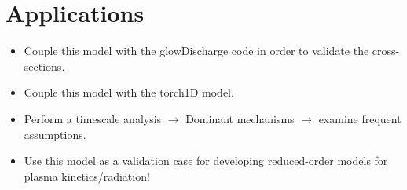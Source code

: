 \section{Applications} \label{sec:Applications}

\begin{itemize}[noitemsep,topsep=1pt,parsep=1pt,partopsep=3pt]
    \item Couple this model with the glowDischarge code in order to validate the cross-sections.
    \item Couple this model with the torch1D model.
    \item Perform a timescale analysis $\rightarrow$ Dominant mechanisms $\rightarrow$ examine frequent assumptions. 
    \item Use this model as a validation case for developing reduced-order models for plasma kinetics/radiation!

\end{itemize}

